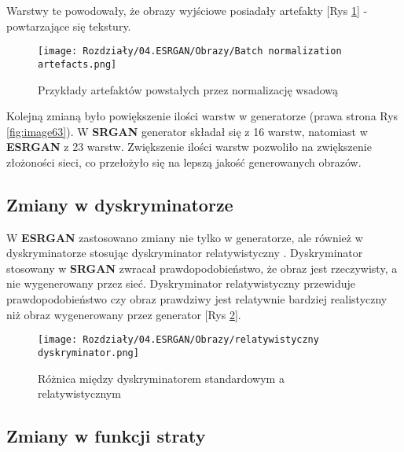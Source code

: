 Warstwy te powodowały, że obrazy wyjściowe posiadały artefakty [Rys \ref{fig:image64}] - powtarzające się tekstury.

\begin{figure}[ht]
    \centering
    \begin{minipage}[t]{0.85\linewidth}
        \texttt{[image: Rozdziały/04.ESRGAN/Obrazy/Batch normalization artefacts.png]}
        \caption{Przykłady artefaktów powstałych przez normalizację wsadową \cite{wang2018esrgan}}
        \label{fig:image64}
    \end{minipage}
\end{figure}

Kolejną zmianą było powiększenie ilości warstw w generatorze (prawa strona Rys \ref{fig:image63}). W \textbf{SRGAN} generator składał się z 16 warstw, natomiast w \textbf{ESRGAN} z 23 warstw. Zwiększenie ilości warstw pozwoliło na zwiększenie złożoności sieci, co przełożyło się na lepszą jakość generowanych obrazów.

\subsection*{Zmiany w dyskryminatorze}

W \textbf{ESRGAN} zastosowano zmiany nie tylko w generatorze, ale również w dyskryminatorze stosując dyskryminator relatywistyczny \cite{jolicoeurmartineau2018relativistic}. Dyskryminator stosowany w \textbf{SRGAN} zwracał prawdopodobieństwo, że obraz jest rzeczywisty, a nie wygenerowany przez sieć. Dyskryminator relatywistyczny przewiduje prawdopodobieństwo czy obraz prawdziwy jest relatywnie bardziej realistyczny niż obraz wygenerowany przez generator [Rys \ref{fig:image66}].

\begin{figure}[ht]
    \centering
    \begin{minipage}[t]{0.85\linewidth}
        \texttt{[image: Rozdziały/04.ESRGAN/Obrazy/relatywistyczny dyskryminator.png]}
        \caption{Różnica między dyskryminatorem standardowym a relatywistycznym \cite{wang2018esrgan}}
        \label{fig:image66}
    \end{minipage}
\end{figure}

\subsection*{Zmiany w funkcji straty}

